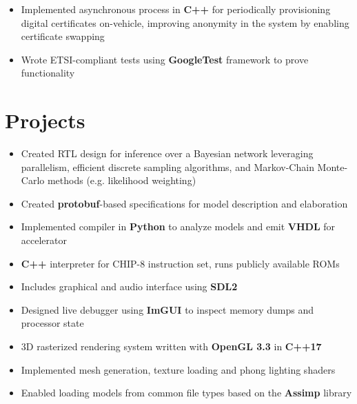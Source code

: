\documentclass{moderncv}
\begin{document}
{\begin{itemize}
    \item Implemented asynchronous process in \textbf{C++} for periodically provisioning digital certificates on-vehicle, improving anonymity in the system by enabling certificate swapping
    \item Wrote ETSI-compliant tests using \textbf{GoogleTest} framework to prove functionality
\end{itemize}}


\section{Projects}
{\begin{itemize}
    \item Created RTL design for inference over a Bayesian network leveraging parallelism, efficient discrete sampling algorithms, and Markov-Chain Monte-Carlo methods (e.g. likelihood weighting)
    \item Created \textbf{protobuf}-based specifications for model description and elaboration
    \item Implemented compiler in \textbf{Python} to analyze models and emit \textbf{VHDL} for accelerator
\end{itemize}}

{\begin{itemize}
    \item \textbf{C++} interpreter for CHIP-8 instruction set, runs publicly available ROMs
    \item Includes graphical and audio interface using \textbf{SDL2}
    \item Designed live debugger using \textbf{ImGUI} to inspect memory dumps and processor state
\end{itemize}}

{\begin{itemize}
    \item 3D rasterized rendering system written with \textbf{OpenGL 3.3} in \textbf{C++17}
    \item Implemented mesh generation, texture loading and phong lighting shaders
    \item Enabled loading models from common file types based on the \textbf{Assimp} library
\end{itemize}}
\end{document}

